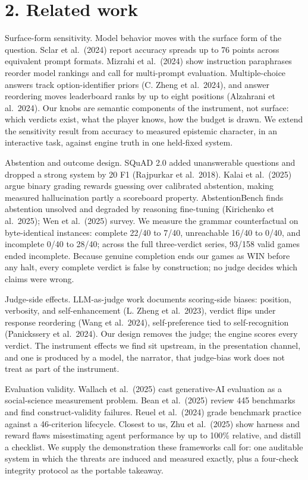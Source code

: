 \documentclass[11pt]{article}
\begin{document}
\section*{2. Related work}

Surface-form sensitivity. Model behavior moves with the surface form of
the question. Sclar et al.~(2024) report accuracy spreads up to 76
points across equivalent prompt formats. Mizrahi et al.~(2024) show
instruction paraphrases reorder model rankings and call for multi-prompt
evaluation. Multiple-choice answers track option-identifier priors (C.
Zheng et al.~2024), and answer reordering moves leaderboard ranks by up
to eight positions (Alzahrani et al.~2024). Our knobs are semantic
components of the instrument, not surface: which verdicts exist, what
the player knows, how the budget is drawn. We extend the sensitivity
result from accuracy to measured epistemic character, in an interactive
task, against engine truth in one held-fixed system.

Abstention and outcome design. SQuAD 2.0 added unanswerable questions
and dropped a strong system by 20 F1 (Rajpurkar et al.~2018). Kalai et
al.~(2025) argue binary grading rewards guessing over calibrated
abstention, making measured hallucination partly a scoreboard property.
AbstentionBench finds abstention unsolved and degraded by reasoning
fine-tuning (Kirichenko et al.~2025); Wen et al.~(2025) survey. We
measure the grammar counterfactual on byte-identical instances: complete
22/40 to 7/40, unreachable 16/40 to 0/40, and incomplete 0/40 to 28/40;
across the full three-verdict series, 93/158 valid games ended
incomplete. Because genuine completion ends our games as WIN before any
halt, every complete verdict is false by construction; no judge decides
which claims were wrong.

Judge-side effects. LLM-as-judge work documents scoring-side biases:
position, verbosity, and self-enhancement (L. Zheng et al.~2023),
verdict flips under response reordering (Wang et al.~2024),
self-preference tied to self-recognition (Panickssery et al.~2024). Our
design removes the judge; the engine scores every verdict. The
instrument effects we find sit upstream, in the presentation channel,
and one is produced by a model, the narrator, that judge-bias work does
not treat as part of the instrument.

Evaluation validity. Wallach et al.~(2025) cast generative-AI evaluation
as a social-science measurement problem. Bean et al.~(2025) review 445
benchmarks and find construct-validity failures. Reuel et al.~(2024)
grade benchmark practice against a 46-criterion lifecycle. Closest to
us, Zhu et al.~(2025) show harness and reward flaws misestimating agent
performance by up to 100\% relative, and distill a checklist. We supply
the demonstration these frameworks call for: one auditable system in
which the threats are induced and measured exactly, plus a four-check
integrity protocol as the portable takeaway.
\end{document}
